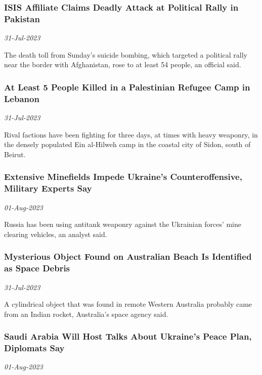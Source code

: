 \subsubsection{ISIS Affiliate Claims Deadly Attack at Political Rally in Pakistan \href{https://www.nytimes.com/2023/07/31/world/asia/pakistan-bombing-isis.html}{}}
\textit{31-Jul-2023}

The death toll from Sunday’s suicide bombing, which targeted a political rally near the border with Afghanistan, rose to at least 54 people, an official said.
\subsubsection{At Least 5 People Killed in a Palestinian Refugee Camp in Lebanon \href{https://www.nytimes.com/2023/07/31/world/middleeast/lebanon-palestine-refugee-camp.html}{}}
\textit{31-Jul-2023}

Rival factions have been fighting for three days, at times with heavy weaponry, in the densely populated Ein al-Hilweh camp in the coastal city of Sidon, south of Beirut.
\subsubsection{Extensive Minefields Impede Ukraine’s Counteroffensive, Military Experts Say \href{https://www.nytimes.com/2023/07/31/world/europe/ukraine-counteroffensive-minefields.html}{}}
\textit{01-Aug-2023}

Russia has been using antitank weaponry against the Ukrainian forces’ mine clearing vehicles, an analyst said.
\subsubsection{Mysterious Object Found on Australian Beach Is Identified as Space Debris \href{https://www.nytimes.com/2023/07/31/world/australia/australia-mystery-object-indian-rocket.html}{}}
\textit{31-Jul-2023}

A cylindrical object that was found in remote Western Australia probably came from an Indian rocket, Australia’s space agency said.
\subsubsection{Saudi Arabia Will Host Talks About Ukraine’s Peace Plan, Diplomats Say \href{https://www.nytimes.com/2023/07/31/world/europe/saudi-arabia-ukraine-peace-talks.html}{}}
\textit{01-Aug-2023}

